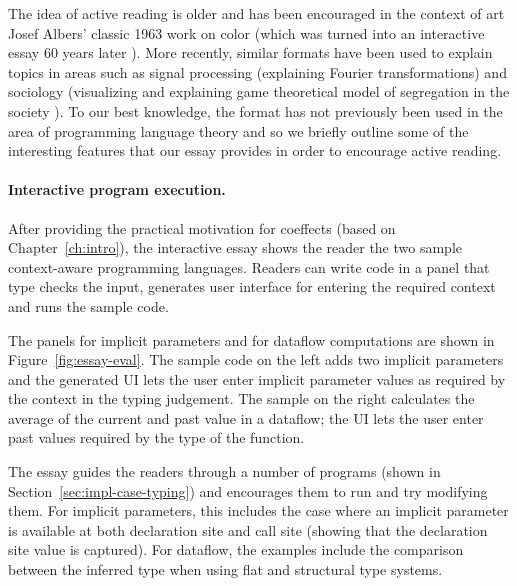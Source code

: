 The idea of active reading is older and has been encouraged in the context of art Josef Albers'
classic 1963 work on color \cite{essay-albers} (which was turned into an interactive essay
60 years later \cite{essay-albers-app}). More recently, similar formats have been used to explain
topics in areas such as signal processing \cite{essay-seeing} (explaining Fourier transformations)
and sociology \cite{essay-polygons} (visualizing and explaining game theoretical model of segregation
in the society \cite{essay-segregation}). To our best knowledge, the format has not previously
been used in the area of programming language theory and so we briefly outline some of the
interesting features that our essay provides in order to encourage active reading.

\paragraph{Interactive program execution.}

After providing the practical motivation for coeffects (based on Chapter~\ref{ch:intro}), the
interactive essay shows the reader the two sample context-aware programming languages. Readers can
write code in a panel that type checks the input, generates user interface for entering the
required context and runs the sample code.

The panels for implicit parameters and for dataflow computations are shown in Figure~\ref{fig:essay-eval}.
The sample code on the left adds two implicit parameters and the generated UI lets the user
enter implicit parameter values as required by the context in the typing judgement. The sample on
the right calculates the average of the current and past value in a dataflow; the UI lets the user
enter past values required by the type of the function.

The essay guides the readers through a number of programs (shown in Section~\ref{sec:impl-case-typing})
and encourages them to run and try modifying them. For implicit parameters, this includes the case
where an implicit parameter is available at both declaration site and call site (showing that the
declaration site value is captured). For dataflow, the examples include the comparison between the
inferred type when using flat and structural type systems.


